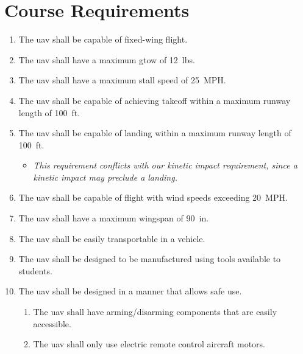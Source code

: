 \chapter{Course Requirements}\label{cp:course_reqs}

\begin{enumerate}
    \item The \acrshort{uav} shall be capable of fixed-wing flight.
    \item The \acrshort{uav} shall have a maximum \acrfull{gtow} of \qty{12}{lbs}.
    \item The \acrshort{uav} shall have a maximum stall speed of \qty{25}{MPH}.
    \item The \acrshort{uav} shall be capable of achieving takeoff within a maximum runway length of \qty{100}{ft}.
    \item The \acrshort{uav} shall be capable of landing within a maximum runway length of \qty{100}{ft}.
    \begin{itemize}
        \item \textit{This requirement conflicts with our kinetic impact requirement, since a kinetic impact may preclude a landing.}
    \end{itemize}
    \item The \acrshort{uav} shall be capable of flight with wind speeds exceeding \qty{20}{MPH}.
    \item The \acrshort{uav} shall have a maximum wingspan of \qty{90}{in}.
    \item The \acrshort{uav} shall be easily transportable in a vehicle.
    \item The \acrshort{uav} shall be designed to be manufactured using tools available to students.
    \item The \acrshort{uav} shall be designed in a manner that allows safe use.
    \begin{enumerate}
        \item The \acrshort{uav} shall have arming/disarming components that are easily accessible.
        \item The \acrshort{uav} shall only use electric remote control aircraft motors.
    \end{enumerate}
\end{enumerate}